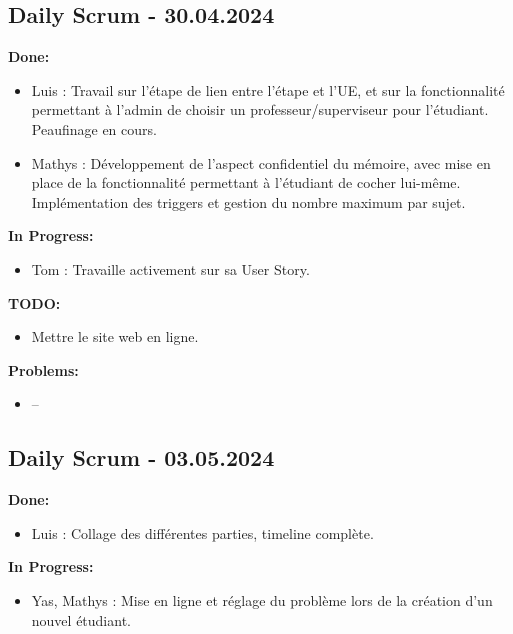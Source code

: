 \documentclass[11pt]{article}
\begin{document}
\subsection*{{\color{navy}Daily Scrum - 30.04.2024}}

\textbf{Done:}
\begin{itemize}
  \item Luis : Travail sur l'étape de lien entre l'étape et l'UE, et sur la fonctionnalité permettant à l'admin de choisir un professeur/superviseur pour l'étudiant. Peaufinage en cours.
  \item Mathys : Développement de l'aspect confidentiel du mémoire, avec mise en place de la fonctionnalité permettant à l'étudiant de cocher lui-même. Implémentation des triggers et gestion du nombre maximum par sujet.
\end{itemize}

\textbf{In Progress:}
\begin{itemize}
  \item Tom : Travaille activement sur sa User Story.
\end{itemize}

\textbf{TODO:}
\begin{itemize}
  \item Mettre le site web en ligne.
\end{itemize}

\textbf{Problems:}
\begin{itemize}
  \item --
\end{itemize}









\subsection*{{\color{navy}Daily Scrum - 03.05.2024}}

\textbf{Done:}
\begin{itemize}
  \item Luis : Collage des différentes parties, timeline complète.
\end{itemize}

\textbf{In Progress:}
\begin{itemize}
  \item Yas, Mathys : Mise en ligne et réglage du problème lors de la création d'un nouvel étudiant.
\end{itemize}
\end{document}
